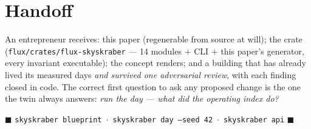 \documentclass[11pt,a4paper]{article}
\begin{document}
\section{Handoff}

An entrepreneur receives: this paper (regenerable from source at will); the
crate (\texttt{flux/crates/flux-skyskraber} --- 14 modules $+$ CLI $+$ this
paper's generator, every invariant executable); the concept renders; and a
building that has already lived its measured days \emph{and survived one
adversarial review}, with each finding closed in code. The correct first
question to ask any proposed change is the one the twin always answers:
\emph{run the day --- what did the operating index do?}

\begin{center}
\vspace{4pt}
\textcolor{qgold}{$\blacksquare$}\quad
\texttt{skyskraber blueprint} \,$\cdot$\, \texttt{skyskraber day --seed 42}
\,$\cdot$\, \texttt{skyskraber api}\quad
\textcolor{qgold}{$\blacksquare$}
\end{center}
\end{document}
